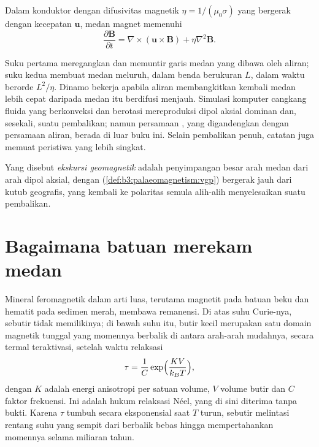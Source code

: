 \begin{proposition}\label{prop:b3:palaeomagnetism:induction}
Dalam konduktor dengan difusivitas magnetik $\eta = 1/(\mu_0\sigma)$ yang bergerak dengan
kecepatan $\mathbf u$, medan magnet memenuhi
\[
  \frac{\partial\mathbf B}{\partial t} = \nabla\times(\mathbf u\times\mathbf B)
  + \eta\nabla^2\mathbf B .
\]
\end{proposition}
\admitted

Suku pertama meregangkan dan memuntir garis medan yang dibawa oleh aliran; suku
kedua membuat medan meluruh, dalam benda berukuran $L$, dalam waktu berorde
$L^2/\eta$. Dinamo bekerja apabila aliran membangkitkan kembali medan lebih cepat
daripada medan itu berdifusi menjauh. Simulasi komputer cangkang fluida yang
berkonveksi dan berotasi mereproduksi dipol aksial dominan dan, sesekali, suatu pembalikan; namun
persamaan , yang digandengkan dengan persamaan aliran, berada di luar
buku ini. Selain pembalikan penuh, catatan juga memuat peristiwa yang lebih singkat.

\begin{definition}\label{def:b3:palaeomagnetism:excursion}
Yang disebut \emph{ekskursi geomagnetik} adalah penyimpangan besar
  arah medan dari arah dipol aksial, dengan
 (\cref{def:b3:palaeomagnetism:vgp}) bergerak jauh dari
kutub geografis, yang kembali ke polaritas semula alih-alih
menyelesaikan suatu pembalikan.
\end{definition}

\section{Bagaimana batuan merekam medan}

Mineral feromagnetik dalam arti luas, terutama magnetit pada batuan beku
dan hematit pada sedimen merah, membawa remanensi. Di atas suhu Curie-nya,
sebutir tidak memilikinya; di bawah suhu itu, butir kecil merupakan satu domain magnetik tunggal yang
momennya berbalik di antara arah-arah mudahnya, secara termal teraktivasi, setelah
waktu relaksasi
\[
  \tau = \frac1C\exp\Bigl(\frac{K V}{k_B T}\Bigr),
\]
dengan $K$ adalah energi anisotropi per satuan volume, $V$ volume butir
dan $C$ faktor frekuensi. Ini adalah hukum relaksasi Néel, yang di sini diterima tanpa bukti. Karena
$\tau$ tumbuh secara eksponensial saat $T$ turun, sebutir melintasi rentang
suhu yang sempit dari berbalik bebas hingga mempertahankan momennya selama miliaran
tahun.

